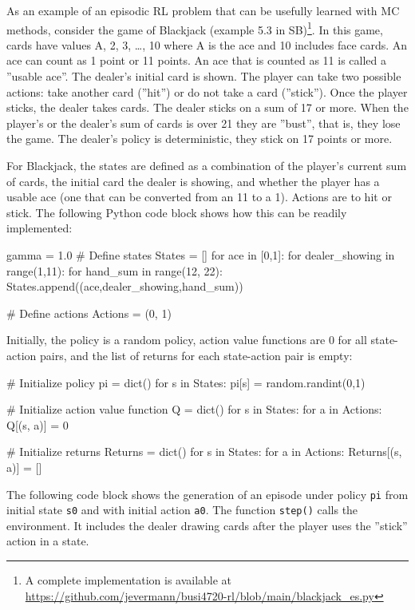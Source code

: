 As an example of an episodic RL problem that can be usefully learned with MC methods, consider the game of Blackjack (example 5.3 in SB)\footnote{A complete implementation is available at \url{https://github.com/jevermann/busi4720-rl/blob/main/blackjack_es.py}}. In this game,
cards have values A, 2, 3, \ldots, 10 where A is the ace and 10 includes face cards. An ace can count as 1 point or 11 points. An ace that is counted as 11 is called a ''usable ace''. The dealer's initial card is shown. The player can take two possible actions: take another card (''hit'') or do not take a card (''stick''). Once the player sticks, the dealer takes cards. The dealer sticks on a sum of 17 or more. When the player's or the dealer's sum of cards is over 21 they are ''bust'', that is, they lose the game. The dealer's policy is deterministic, they stick on 17 points or more. 

For Blackjack, the states are defined as a combination of the player's current sum of cards, the initial card the dealer is showing, and whether the player has a usable ace (one that can be converted from an 11 to a 1). Actions are to hit or stick. The following Python code block shows how this can be readily implemented:

\begin{pythoncode}
gamma = 1.0
# Define states
States = []
for ace in [0,1]:
    for dealer_showing in range(1,11):
        for hand_sum in range(12, 22):
            States.append((ace,dealer_showing,hand_sum))

# Define actions
Actions = (0, 1)
\end{pythoncode}

Initially, the policy is a random policy, action value functions are 0 for all state-action pairs, and the list of returns for each state-action pair is empty:

\begin{pythoncode}
# Initialize policy
pi = dict()
for s in States:
    pi[s] = random.randint(0,1)

# Initialize action value function
Q = dict()
for s in States:
    for a in Actions:
        Q[(s, a)] = 0

# Initialize returns
Returns = dict()
for s in States:
    for a in Actions:
        Returns[(s, a)] = []
\end{pythoncode}

The following code block shows the generation of an episode under policy \texttt{pi} from initial state \texttt{s0} and with initial action \texttt{a0}. The function \texttt{step()} calls the environment. It includes the dealer drawing cards after the player uses the ''stick'' action in a state. 

